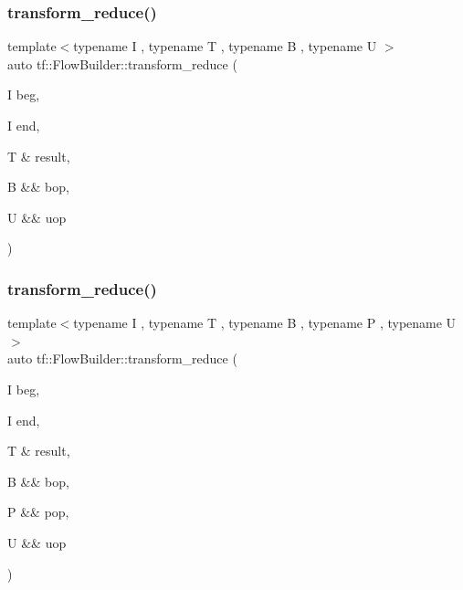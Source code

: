 \mbox{\label{classtf_1_1FlowBuilder_ac4d38ee88ae922d3cb8c9808c418764f}} 
\subsubsection{\texorpdfstring{transform\+\_\+reduce()}{transform\_reduce()}\hspace{0.1cm}{\footnotesize\ttfamily [1/2]}}
{\footnotesize\ttfamily template$<$typename I , typename T , typename B , typename U $>$ \\
auto tf\+::\+Flow\+Builder\+::transform\+\_\+reduce (\begin{DoxyParamCaption}\item[{I}]{beg,  }\item[{I}]{end,  }\item[{T \&}]{result,  }\item[{B \&\&}]{bop,  }\item[{U \&\&}]{uop }\end{DoxyParamCaption})}

\mbox{\label{classtf_1_1FlowBuilder_a7bf4ad06f14f95bbc886ee087773712a}} 
\subsubsection{\texorpdfstring{transform\+\_\+reduce()}{transform\_reduce()}\hspace{0.1cm}{\footnotesize\ttfamily [2/2]}}
{\footnotesize\ttfamily template$<$typename I , typename T , typename B , typename P , typename U $>$ \\
auto tf\+::\+Flow\+Builder\+::transform\+\_\+reduce (\begin{DoxyParamCaption}\item[{I}]{beg,  }\item[{I}]{end,  }\item[{T \&}]{result,  }\item[{B \&\&}]{bop,  }\item[{P \&\&}]{pop,  }\item[{U \&\&}]{uop }\end{DoxyParamCaption})}



